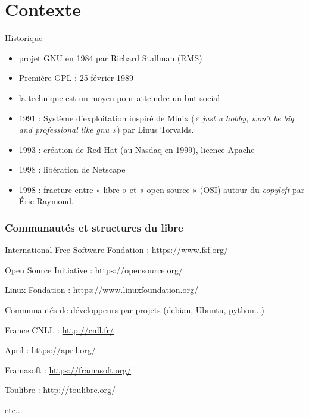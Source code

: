 \documentclass{beamer}
\begin{document}

\section{Contexte}

\begin{frame}{Historique}
  \begin{itemize}
  \item projet GNU en 1984 par Richard Stallman (RMS)
  \item Première GPL : 25 février 1989
  \item la technique est un moyen pour atteindre un but social
  \item 1991 : Système d'exploitation inspiré de Minix (\textit{« just
      a hobby, won’t be big and professional like gnu »}) par Linus
    Torvalds.
  \item 1993 : création de Red Hat (au Nasdaq en 1999), licence Apache
  \item 1998 : libération de Netscape
  \item 1998 : fracture entre « libre » et « open-source » (OSI)
    autour du \textit{copyleft} par Éric Raymond.
  \end{itemize}
\end{frame}


\begin{frame}[plain]%
%  
\end{frame}


\begin{frame}[plain]%
%  
\end{frame}

\begin{frame}\frametitle{Communautés et structures du libre}

  \begin{block}{International}
    Free Software Fondation : \url{https://www.fsf.org/}

    Open Source Initiative : \url{https://opensource.org/}

    Linux Fondation : \url{https://www.linuxfoundation.org/}

    Communautés de développeurs par projets (debian, Ubuntu, python...)
  \end{block}

  \begin{block}{France}
    CNLL : \url{http://cnll.fr/}

    April : \url{https://april.org/}

    Framasoft : \url{https://framasoft.org/}

    Toulibre : \url{http://toulibre.org/}

    etc...
  \end{block}
\end{frame}
\end{document}

